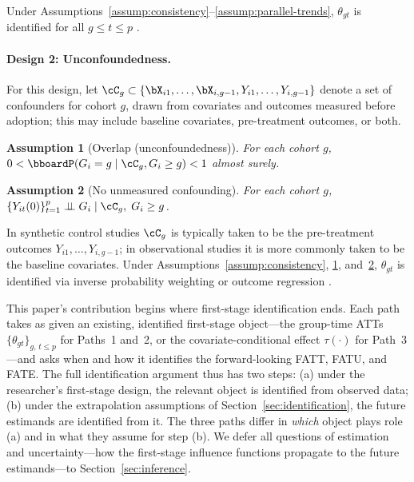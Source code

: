\documentclass{article}
\renewcommand{\P}{\bboardP}
\newtheorem{assumption}{Assumption}
\begin{document}
\noindent Under Assumptions~\ref{assump:consistency}--\ref{assump:parallel-trends}, $\theta_{gt}$ is identified for all $g \leq t \leq p$ \citep{callawayDifferenceindifferencesMultipleTime2021}.

\paragraph{Design 2: Unconfoundedness.}

For this design, let $\cC_g \subset \{\bX_{i1}, \ldots, \bX_{i,g-1}, Y_{i1}, \ldots, Y_{i,g-1}\}$ denote a set of confounders for cohort $g$, drawn from covariates and outcomes measured before adoption; this may include baseline covariates, pre-treatment outcomes, or both.
\begin{assumption}[Overlap (unconfoundedness)]
\label{assump:overlap-unc}
For each cohort $g$, $0 < \P(G_i = g \mid \cC_g, G_i \geq g) < 1$ almost surely.
\end{assumption}

\begin{assumption}[No unmeasured confounding]
\label{assump:no-confounding}
For each cohort $g$, $\{Y_{it}(0)\}_{t=1}^{p} \perp\!\!\!\perp G_i \mid \cC_g,\; G_i \geq g$.
\end{assumption}
In synthetic control studies $\cC_g$ is typically taken to be the pre-treatment outcomes $Y_{i1}, \ldots, Y_{i,g-1}$; in observational studies it is more commonly taken to be the baseline covariates.
\noindent Under Assumptions~\ref{assump:consistency}, \ref{assump:overlap-unc}, and~\ref{assump:no-confounding}, $\theta_{gt}$ is identified via inverse probability weighting or outcome regression \citep{callawayDifferenceindifferencesMultipleTime2021}.

\medskip
This paper's contribution begins where first-stage identification ends. Each path takes as given an existing, identified first-stage object---the group-time ATTs $\{\theta_{gt}\}_{g,\,t\leq p}$ for Paths~1 and~2, or the covariate-conditional effect $\tau(\cdot)$ for Path~3---and asks when and how it identifies the forward-looking FATT, FATU, and FATE. The full identification argument thus has two steps: (a) under the researcher's first-stage design, the relevant object is identified from observed data; (b) under the extrapolation assumptions of Section~\ref{sec:identification}, the future estimands are identified from it. The three paths differ in \emph{which} object plays role (a) and in what they assume for step (b). We defer all questions of estimation and uncertainty---how the first-stage influence functions propagate to the future estimands---to Section~\ref{sec:inference}.
\end{document}
